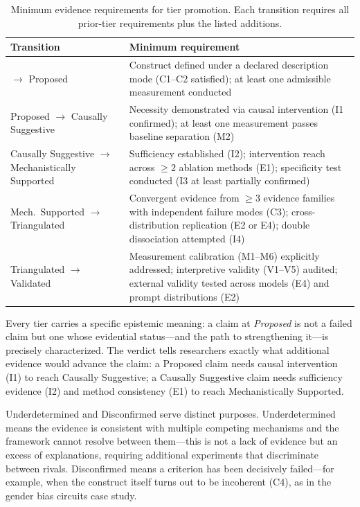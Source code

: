 \documentclass{article}
\begin{document}
\begin{table}[H]
\centering
\small
\caption{Minimum evidence requirements for tier promotion. Each transition requires all prior-tier requirements plus the listed additions.}
\label{tab:tier-promotion}
\renewcommand{\arraystretch}{1.15}
\begin{tabular}{@{}l>{\raggedright\arraybackslash}p{10cm}@{}}
\toprule
\textbf{Transition} & \textbf{Minimum requirement} \\
\midrule
$\to$ Proposed & Construct defined under a declared description mode (C1--C2 satisfied); at least one admissible measurement conducted \\
\midrule
Proposed $\to$ Causally Suggestive & Necessity demonstrated via causal intervention (I1 confirmed); at least one measurement passes baseline separation (M2) \\
\midrule
Causally Suggestive $\to$ Mechanistically Supported & Sufficiency established (I2); intervention reach across $\geq 2$ ablation methods (E1); specificity test conducted (I3 at least partially confirmed) \\
\midrule
Mech.\ Supported $\to$ Triangulated & Convergent evidence from $\geq 3$ evidence families with independent failure modes (C3); cross-distribution replication (E2 or E4); double dissociation attempted (I4) \\
\midrule
Triangulated $\to$ Validated & Measurement calibration (M1--M6) explicitly addressed; interpretive validity (V1--V5) audited; external validity tested across models (E4) and prompt distributions (E2) \\
\bottomrule
\end{tabular}
\end{table}

Every tier carries a specific epistemic meaning: a claim at \emph{Proposed} is not a failed claim but one whose evidential status---and the path to strengthening it---is precisely characterized. The verdict tells researchers exactly what additional evidence would advance the claim: a Proposed claim needs causal intervention (I1) to reach Causally Suggestive; a Causally Suggestive claim needs sufficiency evidence (I2) and method consistency (E1) to reach Mechanistically Supported.

Underdetermined and Disconfirmed serve distinct purposes. Underdetermined means the evidence is consistent with multiple competing mechanisms and the framework cannot resolve between them---this is not a lack of evidence but an excess of explanations, requiring additional experiments that discriminate between rivals. Disconfirmed means a criterion has been decisively failed---for example, when the construct itself turns out to be incoherent (C4), as in the gender bias circuits case study.
\end{document}
